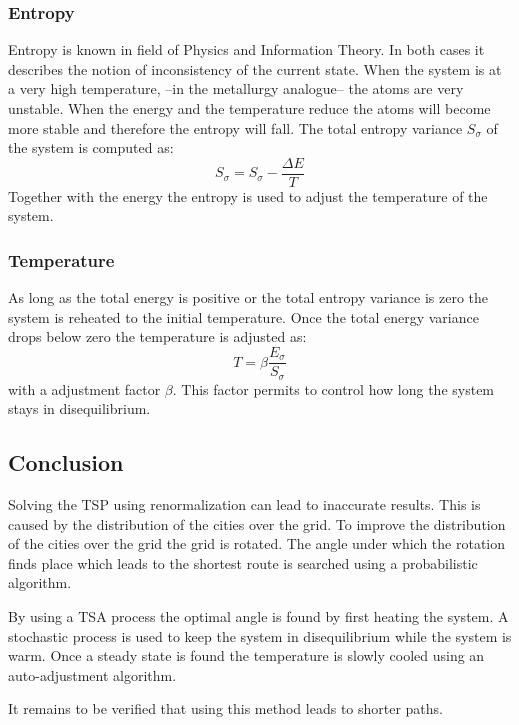 \subsubsection{Entropy}
Entropy is known in field of Physics and Information Theory. In both cases it
describes the notion of inconsistency of the current state. When the system is
at a very high temperature, --in the metallurgy analogue-- the atoms are very
unstable. When the energy and the temperature reduce the atoms will become
more stable and therefore the entropy will fall. The total entropy variance
$S_\sigma$ of the system is computed as:
\begin{equation}\label{eq:entropy}
S_\sigma = S_\sigma - \frac{\Delta E}{T}
\end{equation}
Together with the energy the entropy is used to adjust the temperature of the
system.

\subsubsection{Temperature}
As long as the total energy is positive or the total entropy variance is zero
the system is reheated to the initial temperature. Once the total energy
variance drops below zero the temperature is adjusted as:
\begin{equation}\label{eq:tempadj}
T = \beta\frac{E_\sigma}{S_\sigma}
\end{equation}
with a adjustment factor $\beta$. This factor permits to control how long the
system stays in disequilibrium. 

\subsection{Conclusion}
Solving the TSP using renormalization can lead to inaccurate results. This is
caused by the distribution of the cities over the grid. To improve the
distribution of the cities over the grid the grid is rotated. The angle under
which the rotation finds place which leads to the shortest route is searched
using a probabilistic algorithm. 

By using a TSA process the optimal angle is found by first
heating the system. A stochastic process is used to keep the system in
disequilibrium while the system is warm. Once a steady state is found the
temperature is slowly cooled using an auto-adjustment algorithm.

It remains to be verified that using this method leads to shorter paths.


